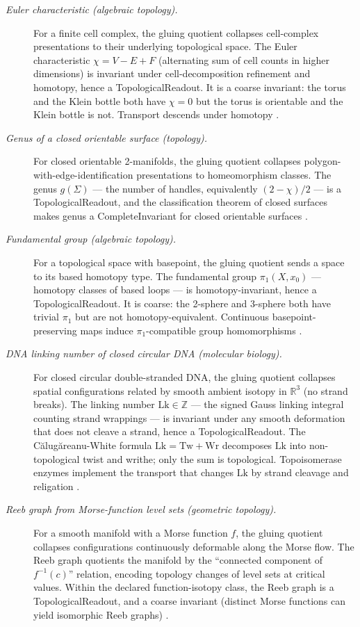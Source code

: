 \documentclass[11pt]{article}
\theoremstyle{definition}
\begin{document}
\begin{description}
\item[\emph{Euler characteristic (algebraic
topology).}]
For a finite cell complex, the gluing quotient
collapses cell-complex presentations to their
underlying topological space.  The Euler
characteristic
\(\chi=V-E+F\) (alternating sum of cell counts in
higher dimensions) is invariant under
cell-decomposition refinement and homotopy, hence a
TopologicalReadout.  It is a coarse invariant: the
torus and the Klein bottle both have \(\chi=0\) but
the torus is orientable and the Klein bottle is
not.  Transport descends under homotopy
\citep{Euler1750Polyhedron}.

\item[\emph{Genus of a closed orientable surface
(topology).}]
For closed orientable 2-manifolds, the gluing
quotient collapses polygon-with-edge-identification
presentations to homeomorphism classes.  The genus
\(g(\Sigma)\) — the number of handles, equivalently
\((2-\chi)/2\) — is a TopologicalReadout, and the
classification theorem of closed surfaces makes
genus a CompleteInvariant for closed orientable
surfaces \citep{Riemann1857Theorie}.

\item[\emph{Fundamental group (algebraic topology).}]
For a topological space with basepoint, the gluing
quotient sends a space to its based homotopy type.
The fundamental group \(\pi_1(X,x_0)\) — homotopy
classes of based loops — is homotopy-invariant,
hence a TopologicalReadout.  It is coarse: the
2-sphere and 3-sphere both have trivial \(\pi_1\)
but are not homotopy-equivalent.  Continuous
basepoint-preserving maps induce \(\pi_1\)-compatible
group homomorphisms \citep{Poincare1895Analysis}.

\item[\emph{{DNA} linking number of closed circular
{DNA} (molecular biology).}]
For closed circular double-stranded DNA, the
gluing quotient collapses spatial configurations
related by smooth ambient isotopy in
\(\mathbb R^3\) (no strand breaks).  The linking
number \(\mathrm{Lk}\in\mathbb Z\) — the signed
Gauss linking integral counting strand wrappings
— is invariant under any smooth deformation that
does not cleave a strand, hence a
TopologicalReadout.  The Călugăreanu-White formula
\(\mathrm{Lk}=\mathrm{Tw}+\mathrm{Wr}\) decomposes
\(\mathrm{Lk}\) into non-topological twist and
writhe; only the sum is topological.
Topoisomerase enzymes implement the transport that
changes \(\mathrm{Lk}\) by strand cleavage and
religation \citep{BatesMaxwell2005DNATopology}.

\item[\emph{Reeb graph from {M}orse-function level
sets (geometric topology).}]
For a smooth manifold with a Morse function \(f\),
the gluing quotient collapses configurations
continuously deformable along the Morse flow.  The
Reeb graph quotients the manifold by the
``connected component of \(f^{-1}(c)\)'' relation,
encoding topology changes of level sets at
critical values.  Within the declared
function-isotopy class, the Reeb graph is a
TopologicalReadout, and a coarse invariant
(distinct Morse functions can yield isomorphic
Reeb graphs) \citep{Reeb1946Points}.
\end{description}
\end{document}
